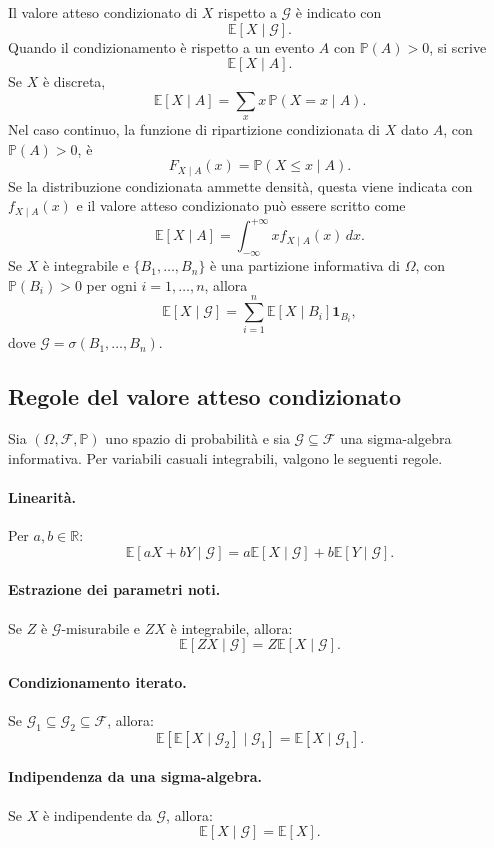 \documentclass[12pt,a4paper]{article}
\newcommand{\R}{\mathbb{R}}
\newcommand{\E}{\mathbb{E}}
\newcommand{\Prob}{\mathbb{P}}
\newcommand{\F}{\mathcal{F}}
\newcommand{\G}{\mathcal{G}}
\newcommand{\1}{\mathbf{1}}
\begin{document}
Il valore atteso condizionato di $X$ rispetto a $\G$ \`e indicato con
\[
 \E[X\mid \G].
\]
Quando il condizionamento \`e rispetto a un evento $A$ con $\Prob(A)>0$, si
scrive
\[
 \E[X\mid A].
\]
Se $X$ \`e discreta,
\[
 \E[X\mid A]=\sum_x x\,\Prob(X=x\mid A).
\]
Nel caso continuo, la funzione di ripartizione condizionata di $X$ dato $A$,
con $\Prob(A)>0$, \`e
\[
 F_{X\mid A}(x)=\Prob(X\leq x\mid A).
\]
Se la distribuzione condizionata ammette densit\`a, questa viene indicata con
$f_{X\mid A}(x)$ e il valore atteso condizionato pu\`o essere scritto come
\[
 \E[X\mid A]
 =
 \int_{-\infty}^{+\infty} x f_{X\mid A}(x)\,dx.
\]
Se $X$ \`e integrabile e $\{B_1,\ldots,B_n\}$ \`e una partizione
informativa di $\Omega$, con $\Prob(B_i)>0$ per ogni $i=1,\ldots,n$, allora
\[
\E[X\mid \G]=\sum_{i=1}^{n}\E[X\mid B_i]\1_{B_i},
\]
dove $\G=\sigma(B_1,\ldots,B_n)$.

\subsection*{Regole del valore atteso condizionato}

Sia $(\Omega,\F,\Prob)$ uno spazio di probabilit\`a e sia
$\G\subseteq\F$ una sigma-algebra informativa. Per variabili casuali integrabili,
valgono le seguenti regole.

\paragraph{Linearit\`a.}
Per $a,b\in\R$:
\[
\E[aX+bY\mid\G]
=
a\E[X\mid\G]+b\E[Y\mid\G].
\]

\paragraph{Estrazione dei parametri noti.}
Se $Z$ \`e $\G$-misurabile e $ZX$ \`e integrabile, allora:
\[
\E[ZX\mid\G]=Z\E[X\mid\G].
\]

\paragraph{Condizionamento iterato.}
Se $\G_1\subseteq\G_2\subseteq\F$, allora:
\[
\E\left[\E[X\mid\G_2]\mid\G_1\right]
=
\E[X\mid\G_1].
\]

\paragraph{Indipendenza da una sigma-algebra.}
Se $X$ \`e indipendente da $\G$, allora:
\[
\E[X\mid\G]=\E[X].
\]
\end{document}
